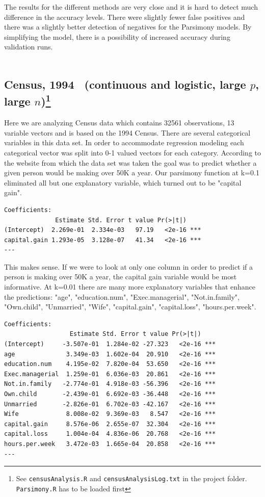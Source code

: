 \documentclass[letter]{article}
\newcounter{foot}
\begin{document}
The results for the different methods are very close and it is hard to detect much difference in the accuracy levels. There were slightly fewer false positives and there was a slightly better detection of negatives for the Parsimony models. By simplifying the model, there is a possibility of increased accuracy during validation runs.
\\
\\


\subsection*{Census, 1994~\cite{census} (continuous and logistic, large $p$, large $n$)\footnote{See \texttt{censusAnalysis.R} and \texttt{censusAnalysisLog.txt} in the project folder. \texttt{Parsimony.R} has to be loaded first}}
Here we are analyzing Census data which contains 32561 observations, 13 variable vectors and is based on the 1994 Census. There are several categorical variables in this data set. In order to accommodate regression modeling each categorical vector was split into 0-1 valued vectors for each category. According to the website from which the data set was taken the goal was to predict whether a given person would be making over 50K a year.  Our parsimony function at k=0.1 eliminated all but one explanatory variable, which turned out to be "capital gain". 
\begin{verbatim}
Coefficients:
              Estimate Std. Error t value Pr(>|t|)    
(Intercept)  2.269e-01  2.334e-03   97.19   <2e-16 ***
capital.gain 1.293e-05  3.128e-07   41.34   <2e-16 ***
---

\end{verbatim}

This makes sense. If we were to look at only one column in order to predict if a person is making over 50K a year, the capital gain variable would be most informative. At k=0.01 there are many more explanatory variables that enhance the predictions:  "age", "education.num", "Exec.managerial", "Not.in.family", "Own.child", "Unmarried", "Wife", "capital.gain", "capital.loss", "hours.per.week".

\begin{verbatim}
Coefficients:
                  Estimate Std. Error t value Pr(>|t|)    
(Intercept)     -3.507e-01  1.284e-02 -27.323   <2e-16 ***
age              3.349e-03  1.602e-04  20.910   <2e-16 ***
education.num    4.195e-02  7.820e-04  53.650   <2e-16 ***
Exec.managerial  1.259e-01  6.036e-03  20.861   <2e-16 ***
Not.in.family   -2.774e-01  4.918e-03 -56.396   <2e-16 ***
Own.child       -2.439e-01  6.692e-03 -36.448   <2e-16 ***
Unmarried       -2.826e-01  6.702e-03 -42.167   <2e-16 ***
Wife             8.008e-02  9.369e-03   8.547   <2e-16 ***
capital.gain     8.576e-06  2.655e-07  32.304   <2e-16 ***
capital.loss     1.004e-04  4.836e-06  20.768   <2e-16 ***
hours.per.week   3.472e-03  1.665e-04  20.858   <2e-16 ***
---
\end{verbatim}
\end{document}
